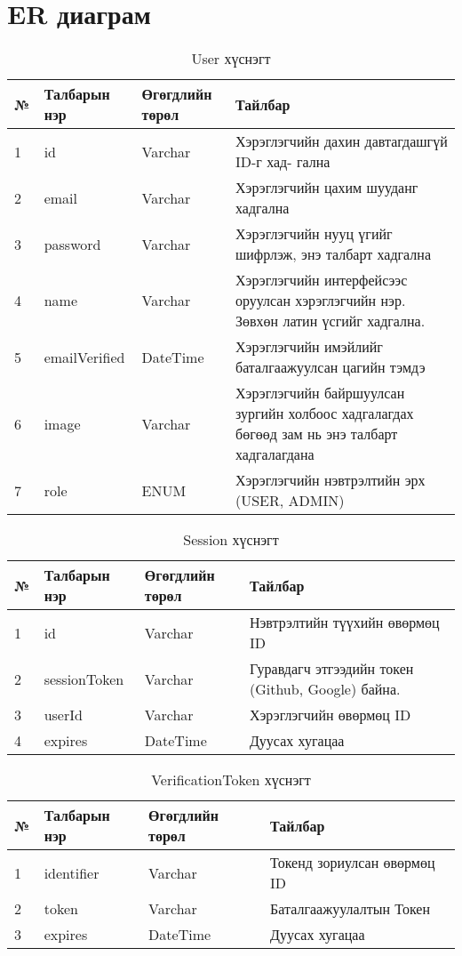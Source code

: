 \section{ER диаграм}
\begin{table}[h]
	\caption{User хүснэгт}
	\begin{tabular}{|l|l|l|p{8cm}|}
	\hline
	№ &  Талбарын нэр & Өгөгдлийн төрөл & Тайлбар \\ \hline
	1 &  id & Varchar & Хэрэглэгчийн дахин давтагдашгүй ID-г хад-
	гална\\ \hline
	2 &  email & Varchar & Хэрэглэгчийн цахим шууданг хадгална\\ \hline
	3 &  password & Varchar & Хэрэглэгчийн нууц үгийг шифрлэж, энэ талбарт хадгална \\ \hline
    4 &  name & Varchar & Хэрэглэгчийн интерфейсээс оруулсан хэрэглэгчийн нэр. Зөвхөн латин үсгийг хадгална. \\ \hline
	5 &  emailVerified & DateTime & Хэрэглэгчийн имэйлийг баталгаажуулсан цагийн тэмдэ \\ \hline
	6 &  image & Varchar & Хэрэглэгчийн байршуулсан зургийн холбоос хадгалагдах бөгөөд зам нь энэ талбарт хадгалагдана \\ \hline
	7 &  role & ENUM & Хэрэглэгчийн нэвтрэлтийн эрх (USER, ADMIN) \\ \hline
\end{tabular}
\end{table}


\begin{table}[h]
	\caption{Session хүснэгт}
	\begin{tabular}{|l|l|l|p{8cm}|}
	\hline
	№ &  Талбарын нэр & Өгөгдлийн төрөл & Тайлбар \\ \hline
	1 &  id & Varchar & Нэвтрэлтийн түүхийн өвөрмөц ID \\ \hline
	2 &  sessionToken & Varchar & Гуравдагч этгээдийн токен (Github, Google) байна. \\ \hline
	3 &  userId & Varchar & Хэрэглэгчийн өвөрмөц ID \\ \hline
	4 &  expires & DateTime & Дуусах хугацаа \\ \hline
\end{tabular}
\end{table}

\begin{table}[h]
	\caption{VerificationToken хүснэгт}
	\begin{tabular}{|l|l|l|p{8cm}|}
	\hline
	№ &  Талбарын нэр & Өгөгдлийн төрөл & Тайлбар \\ \hline
	1 &  identifier & Varchar & Токенд зориулсан өвөрмөц ID\\ \hline
	2 &  token & Varchar & Баталгаажуулалтын Токен \\ \hline
	3 &  expires & DateTime & Дуусах хугацаа \\ \hline
\end{tabular}
\end{table}

